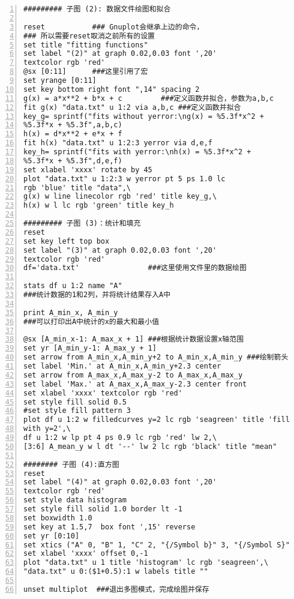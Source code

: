 \begin{lstlisting}[numbers=left,frame=single]
######### 子图 (2): 数据文件绘图和拟合

reset           ### Gnuplot会继承上边的命令，
### 所以需要reset取消之前所有的设置
set title "fitting functions"
set label "(2)" at graph 0.02,0.03 font ',20'  
textcolor rgb 'red'
@sx [0:11]      ###这里引用了宏
set yrange [0:11]
set key bottom right font ",14" spacing 2
g(x) = a*x**2 + b*x + c         ###定义函数并拟合，参数为a,b,c
fit g(x) "data.txt" u 1:2 via a,b,c ###定义函数并拟合
key_g= sprintf("fits without yerror:\ng(x) = %5.3f*x^2 + 
%5.3f*x + %5.3f",a,b,c)
h(x) = d*x**2 + e*x + f
fit h(x) "data.txt" u 1:2:3 yerror via d,e,f
key_h= sprintf("fits with yerror:\nh(x) = %5.3f*x^2 + 
%5.3f*x + %5.3f",d,e,f)
set xlabel 'xxxx' rotate by 45
plot "data.txt" u 1:2:3 w yerror pt 5 ps 1.0 lc 
rgb 'blue' title "data",\
g(x) w line linecolor rgb 'red' title key_g,\
h(x) w l lc rgb 'green' title key_h

######### 子图 (3)：统计和填充
reset
set key left top box
set label "(3)" at graph 0.02,0.03 font ',20'  
textcolor rgb 'red'
df='data.txt'                ###这里使用文件里的数据绘图

stats df u 1:2 name "A"      
###统计数据的1和2列，并将统计结果存入A中

print A_min_x, A_min_y       
###可以打印出A中统计的x的最大和最小值

@sx [A_min_x-1: A_max_x + 1] ###根据统计数据设置x轴范围
set yr [A_min_y-1: A_max_y + 1]
set arrow from A_min_x,A_min_y+2 to A_min_x,A_min_y ###绘制箭头
set label 'Min.' at A_min_x,A_min_y+2.3 center
set arrow from A_max_x,A_max_y-2 to A_max_x,A_max_y
set label 'Max.' at A_max_x,A_max_y-2.3 center front
set xlabel 'xxxx' textcolor rgb 'red'
set style fill solid 0.5 
#set style fill pattern 3
plot df u 1:2 w filledcurves y=2 lc rgb 'seagreen' title 'fill 
with y=2',\
df u 1:2 w lp pt 4 ps 0.9 lc rgb 'red' lw 2,\
[3:6] A_mean_y w l dt '--' lw 2 lc rgb 'black' title "mean"

######## 子图 (4):直方图
reset
set label "(4)" at graph 0.02,0.03 font ',20'  
textcolor rgb 'red'
set style data histogram
set style fill solid 1.0 border lt -1 
set boxwidth 1.0
set key at 1.5,7  box font ',15' reverse
set yr [0:10]
set xtics ("A" 0, "B" 1, "C" 2, "{/Symbol b}" 3, "{/Symbol S}" 4)
set xlabel 'xxxx' offset 0,-1
plot "data.txt" u 1 title 'histogram' lc rgb 'seagreen',\
"data.txt" u 0:($1+0.5):1 w labels title ""

unset multiplot  ###退出多图模式，完成绘图并保存
\end{lstlisting}
\par



